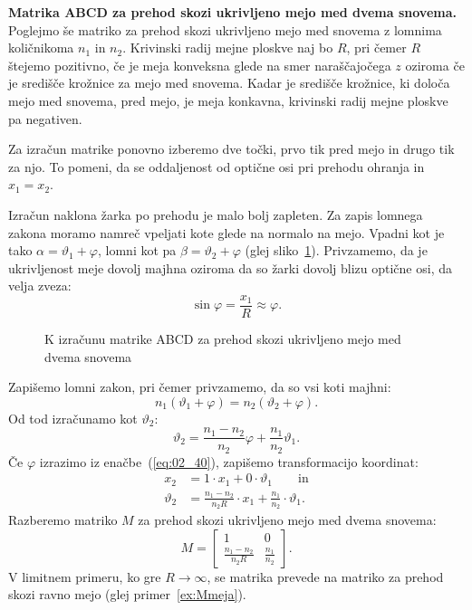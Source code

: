 \begin{example}
\label{ex:MUmeja}
{\bf Matrika ABCD za prehod skozi ukrivljeno mejo med dvema snovema.} 
Poglejmo še matriko za prehod skozi ukrivljeno mejo med snovema z lomnima 
količnikoma $n_1$ in $n_2$. Krivinski radij mejne ploskve
naj bo $R$, pri čemer $R$ štejemo pozitivno, če je meja konveksna glede na smer
naraščajočega $z$ oziroma če je središče krožnice za mejo med snovema. Kadar
je središče krožnice, ki določa mejo med snovema, pred mejo, je meja konkavna, 
krivinski radij mejne ploskve pa negativen. 

Za izračun matrike ponovno izberemo dve točki, prvo tik pred mejo in 
drugo tik za njo. To pomeni, da se oddaljenost od optične osi
pri prehodu ohranja in $x_1 = x_2$. 

Izračun naklona žarka po prehodu je malo bolj zapleten. Za zapis lomnega 
zakona moramo namreč vpeljati kote glede na normalo na
mejo. Vpadni kot je tako $\alpha = \vartheta_1 + \varphi$, lomni kot pa 
$\beta = \vartheta_2 + \varphi$ (glej sliko~\ref{fig:02_ABCD3}).
Privzamemo, da je ukrivljenost meje dovolj majhna oziroma da so žarki
dovolj blizu optične osi, da velja zveza:
\begin{equation}
 \sin \varphi = \frac{x_1}{R} \approx \varphi.
 \label{eq:02_40}
\end{equation}
\begin{figure}[!h]
\centering
\def\svgwidth{70truemm} 

\caption{K izračunu matrike ABCD za prehod skozi ukrivljeno mejo med dvema snovema}
\label{fig:02_ABCD3}
\end{figure}

Zapišemo lomni zakon,
pri čemer privzamemo, da so vsi koti majhni:
\begin{equation}
n_1 (\vartheta_1 + \varphi) = n_2 (\vartheta_2 + \varphi).
\label{eq:02_41}
\end{equation}
Od tod izračunamo kot $\vartheta_2$:
\begin{equation}
 \vartheta_2 = \frac{n_1-n_2}{n_2}\varphi + \frac{n_1}{n_2} \vartheta_1.
 \label{eq:02_42}
 \end{equation}
Če $\varphi$ izrazimo iz enačbe~(\ref{eq:02_40}), zapišemo transformacijo koordinat:
\begin{align}
 x_2 &= 1\cdot x_1 + 0\cdot \vartheta_1 \qquad \mathrm{in} \\
 \vartheta_2 &= \frac{n_1-n_2}{n_2R}\cdot x_1 + \frac{n_1}{n_2}\cdot \vartheta_1.
 \label{eq:02_43}
\end{align}
Razberemo matriko $M$ za prehod skozi ukrivljeno mejo med dvema snovema:
\begin{equation}
M = \left[\begin{array}{cc}
1& 0\\
\frac{n_1-n_2}{n_2R}&\frac{n_1}{n_2}
\end{array}\right]\!\!.
 \label{eq:02_44}
\end{equation}
V limitnem primeru, ko gre $R \to \infty$, se matrika prevede na matriko za
prehod skozi ravno mejo (glej primer~\ref{ex:Mmeja}).
\end{example}

